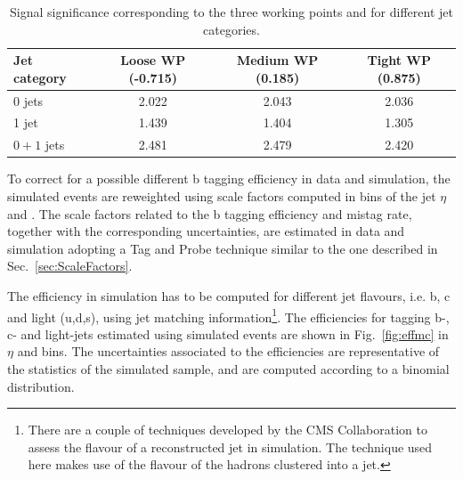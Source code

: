 \begin{table}
\caption{Signal significance corresponding to the three working points and for
different jet categories.\label{tab:significance_wp_combine}}
\begin{center}
\begin{tabular}{lccc}
\toprule
Jet category & Loose WP (-0.715) & Medium WP (0.185) & Tight WP (0.875) \\
\midrule
0 jets & 2.022 & 2.043 & 2.036 \\
1 jet & 1.439 & 1.404 & 1.305 \\
$0+1$ jets & 2.481 & 2.479 & 2.420 \\
\bottomrule
\end{tabular}
\end{center}
\end{table}

To correct for a possible different b tagging efficiency in data and simulation, the simulated events are reweighted using scale factors computed in bins of the jet $\eta$ and \pt.
The scale factors related to the b tagging efficiency and mistag rate, together with the corresponding uncertainties, are estimated in data and simulation adopting a Tag and Probe technique similar to the one described in Sec.~\ref{sec:ScaleFactors}.

The efficiency in simulation has to be computed for different jet flavours, i.e. b, c and light (u,d,s), using jet matching information\footnote{There are a couple of techniques developed by the CMS Collaboration to assess the flavour of a reconstructed jet in simulation. The technique used here makes use of the flavour of the hadrons clustered into a jet.}.
The efficiencies for tagging b-, c- and light-jets estimated using \ttbar simulated events are shown in Fig.~\ref{fig:effmc} in $\eta$ and \pt bins. The uncertainties associated to the efficiencies are representative of the statistics of the simulated \ttbar sample, and are computed according to a binomial distribution.

